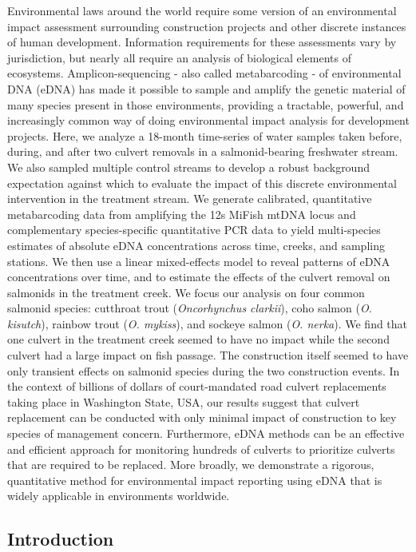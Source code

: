 \documentclass[
]{article}
\begin{document}
Environmental laws around the world require some version of an
environmental impact assessment surrounding construction projects and
other discrete instances of human development. Information requirements
for these assessments vary by jurisdiction, but nearly all require an
analysis of biological elements of ecosystems. Amplicon-sequencing -
also called metabarcoding - of environmental DNA (eDNA) has made it
possible to sample and amplify the genetic material of many species
present in those environments, providing a tractable, powerful, and
increasingly common way of doing environmental impact analysis for
development projects. Here, we analyze a 18-month time-series of water
samples taken before, during, and after two culvert removals in a
salmonid-bearing freshwater stream. We also sampled multiple control
streams to develop a robust background expectation against which to
evaluate the impact of this discrete environmental intervention in the
treatment stream. We generate calibrated, quantitative metabarcoding
data from amplifying the 12s MiFish mtDNA locus and complementary
species-specific quantitative PCR data to yield multi-species estimates
of absolute eDNA concentrations across time, creeks, and sampling
stations. We then use a linear mixed-effects model to reveal patterns of
eDNA concentrations over time, and to estimate the effects of the
culvert removal on salmonids in the treatment creek. We focus our
analysis on four common salmonid species: cutthroat trout
(\emph{Oncorhynchus clarkii}), coho salmon (\emph{O. kisutch}), rainbow
trout (\emph{O. mykiss}), and sockeye salmon (\emph{O. nerka}). We find
that one culvert in the treatment creek seemed to have no impact while
the second culvert had a large impact on fish passage. The construction
itself seemed to have only transient effects on salmonid species during
the two construction events. In the context of billions of dollars of
court-mandated road culvert replacements taking place in Washington
State, USA, our results suggest that culvert replacement can be
conducted with only minimal impact of construction to key species of
management concern. Furthermore, eDNA methods can be an effective and
efficient approach for monitoring hundreds of culverts to prioritize
culverts that are required to be replaced. More broadly, we demonstrate
a rigorous, quantitative method for environmental impact reporting using
eDNA that is widely applicable in environments worldwide.

\newpage

\hypertarget{introduction}{%
\subsection{Introduction}\label{introduction}}
\end{document}
